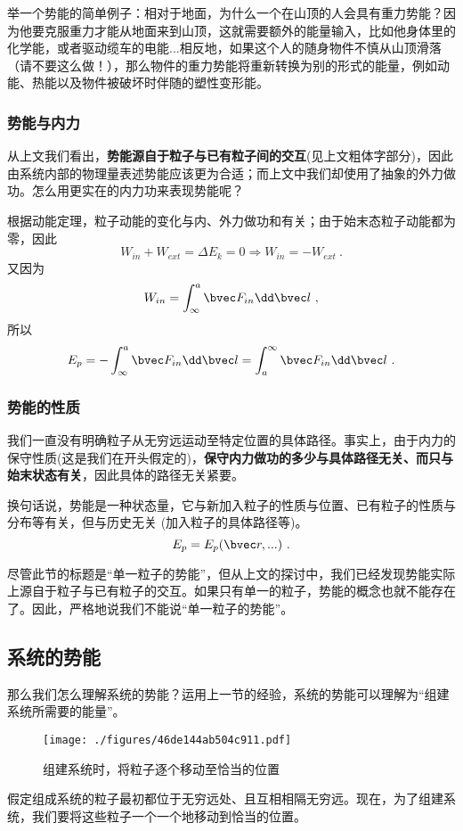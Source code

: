 举一个势能的简单例子：相对于地面，为什么一个在山顶的人会具有重力势能？因为他要克服重力才能从地面来到山顶，这就需要额外的能量输入，比如他身体里的化学能，或者驱动缆车的电能...相反地，如果这个人的随身物件不慎从山顶滑落（请不要这么做！），那么物件的重力势能将重新转换为别的形式的能量，例如动能、热能以及物件被破坏时伴随的塑性变形能。

\subsubsection{势能与内力}
从上文我们看出，\textbf{势能源自于粒子与已有粒子间的交互}(见上文粗体字部分)，因此由系统内部的物理量表述势能应该更为合适；而上文中我们却使用了抽象的外力做功。怎么用更实在的内力功来表现势能呢？

根据动能定理，粒子动能的变化与内、外力做功和有关；由于始末态粒子动能都为零，因此
$$W_{in} + W_{ext} = \Delta E_k = 0 \Rightarrow W_{in} = -W_{ext}~.$$
又因为
$$W_{in} = \int^a_\infty \bvec F_{in} \dd \bvec l~, $$
所以
$$E_p = - \int^a_\infty \bvec F_{in} \dd \bvec l = \int^\infty_a \bvec F_{in} \dd \bvec l~.$$

\subsubsection{势能的性质}
我们一直没有明确粒子从无穷远运动至特定位置的具体路径。事实上，由于内力的保守性质(这是我们在开头假定的)，\textbf{保守内力做功的多少与具体路径无关、而只与始末状态有关}，因此具体的路径无关紧要。%

换句话说，势能是一种状态量，它与新加入粒子的性质与位置、已有粒子的性质与分布等有关，但与历史无关 (加入粒子的具体路径等)。
$$E_p=E_p(\bvec r,...)~.$$

尽管此节的标题是“单一粒子的势能”，但从上文的探讨中，我们已经发现势能实际上源自于粒子与已有粒子的交互。如果只有单一的粒子，势能的概念也就不能存在了。因此，严格地说我们不能说“单一粒子的势能”。

\subsection{系统的势能}
那么我们怎么理解系统的势能？运用上一节的经验，系统的势能可以理解为“组建系统所需要的能量”。

\begin{figure}[ht]
\centering
\texttt{[image: ./figures/46de144ab504c911.pdf]}
\caption{组建系统时，将粒子逐个移动至恰当的位置} \label{fig_POTENT_2}
\end{figure}
假定组成系统的粒子最初都位于无穷远处、且互相相隔无穷远。现在，为了组建系统，我们要将这些粒子一个一个地移动到恰当的位置。

